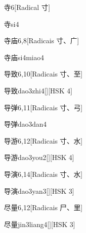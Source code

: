\begin{entry}{寺}{6}[Radical ⼨]
  \begin{phonetics}{寺}{si4}
  \end{phonetics}
\end{entry}

\begin{entry}{寺庙}{6,8}[Radicais ⼨、⼴]
  \begin{phonetics}{寺庙}{si4miao4}
  \end{phonetics}
\end{entry}

\begin{entry}{导致}{6,10}[Radicais ⼨、⾄]
  \begin{phonetics}{导致}{dao3zhi4}[][HSK 4]
  \end{phonetics}
\end{entry}

\begin{entry}{导弹}{6,11}[Radicais ⼨、⼸]
  \begin{phonetics}{导弹}{dao3dan4}
  \end{phonetics}
\end{entry}

\begin{entry}{导游}{6,12}[Radicais ⼨、⽔]
  \begin{phonetics}{导游}{dao3you2}[][HSK 4]
  \end{phonetics}
\end{entry}

\begin{entry}{导演}{6,14}[Radicais ⼨、⽔]
  \begin{phonetics}{导演}{dao3yan3}[][HSK 3]
  \end{phonetics}
\end{entry}

\begin{entry}{尽量}{6,12}[Radicais ⼫、⾥]
  \begin{phonetics}{尽量}{jin3liang4}[][HSK 3]
  \end{phonetics}
\end{entry}


